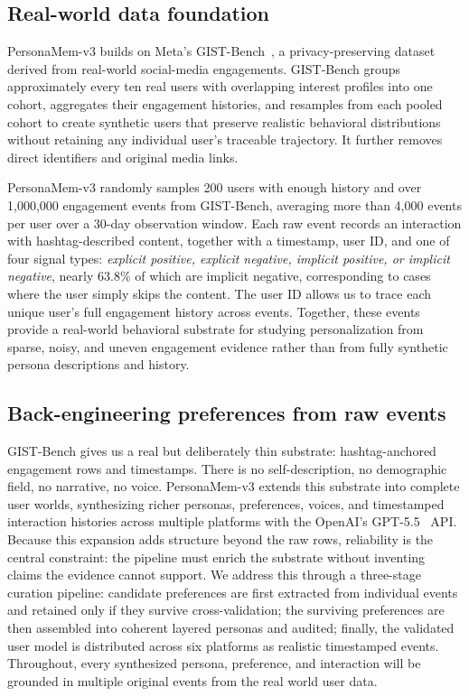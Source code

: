 \documentclass[]{fairmeta}
\begin{document}
\subsection{Real-world data foundation}
\label{subsec:data_foundation}
PersonaMem-v3 builds on Meta’s GIST-Bench~\citep{fostiropoulos2026gistbench}, a privacy-preserving dataset derived from real-world social-media engagements. GIST-Bench groups approximately every ten real users with overlapping interest profiles into one cohort, aggregates their engagement histories, and resamples from each pooled cohort to create synthetic users that preserve realistic behavioral distributions without retaining any individual user’s traceable trajectory. It further removes direct identifiers and original media links. 

PersonaMem-v3 randomly samples 200 users with enough history and over 1,000,000 engagement events from GIST-Bench, averaging more than 4,000 events per user over a 30-day observation window. Each raw event records an interaction with hashtag-described content, together with a timestamp, user ID, and one of four signal types: \textit{explicit positive, explicit negative, implicit positive, or implicit negative}, nearly 63.8\% of which are implicit negative, corresponding to cases where the user simply skips the content. The user ID allows us to trace each unique user’s full engagement history across events.
Together, these events provide a real-world behavioral substrate for studying personalization from sparse, noisy, and uneven engagement evidence rather than from fully synthetic persona descriptions and history.


\subsection{Back-engineering preferences from raw events}
\label{subsec:pref_inference}

GIST-Bench gives us a real but deliberately thin substrate: hashtag-anchored engagement rows and timestamps. There is no self-description, no demographic field, no narrative, no voice.
PersonaMem-v3 extends this substrate into complete user worlds, synthesizing richer personas, preferences, voices, and timestamped interaction histories across multiple platforms with the OpenAI's GPT-5.5~\citep{openai2026gpt55systemcard} API. Because this expansion adds structure beyond the raw rows, reliability is the central constraint: the pipeline must enrich the substrate without inventing claims the evidence cannot support. We address this through a three-stage curation pipeline: candidate preferences are first extracted from individual events and retained only if they survive cross-validation; the surviving preferences are then assembled into coherent layered personas and audited; finally, the validated user model is distributed across six platforms as realistic timestamped events. Throughout, every synthesized persona, preference, and interaction will be grounded in multiple original events from the real world user data.
\end{document}

